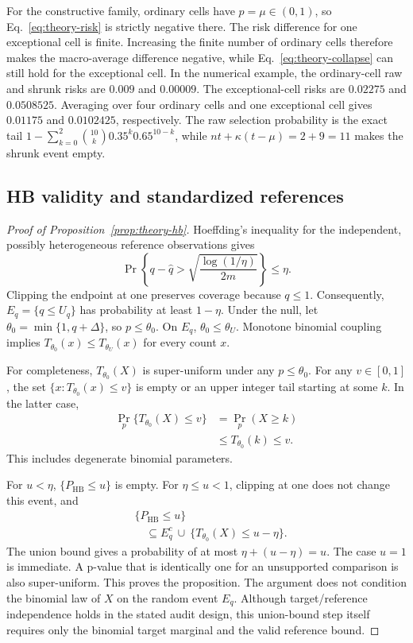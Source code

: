 For the constructive family, ordinary cells have $p=\mu\in(0,1)$, so
Eq.~\eqref{eq:theory-risk} is strictly negative there. The risk difference
for one exceptional cell is finite. Increasing the finite number of
ordinary cells therefore makes the macro-average difference negative,
while Eq.~\eqref{eq:theory-collapse} can still hold for the exceptional
cell. In the numerical example, the ordinary-cell raw and shrunk risks
are $0.009$ and $0.00009$. The exceptional-cell risks are $0.02275$ and
$0.0508525$. Averaging over four ordinary cells and one exceptional cell gives
$0.01175$ and $0.0102425$, respectively. The raw selection probability is
the exact tail
$1-\sum_{k=0}^2 {10\choose k}0.35^k0.65^{10-k}$, while
$nt+\kappa(t-\mu)=2+9=11$ makes the shrunk event empty.

\subsection{HB validity and standardized references}

\begin{proof}[Proof of Proposition~\ref{prop:theory-hb}]
Hoeffding's inequality for the independent, possibly heterogeneous
reference observations gives
\[
 \Pr\left\{q-\widehat q>
       \sqrt{\frac{\log(1/\eta)}{2m}}\right\}\le\eta.
\]
Clipping the endpoint at one preserves coverage because $q\le1$.
Consequently, $E_q=\{q\le U_q\}$ has probability at least $1-\eta$.
Under the null, let $\theta_0=\min\{1,q+\Delta\}$, so
$p\le\theta_0$. On $E_q$, $\theta_0\le\theta_U$. Monotone binomial
coupling implies $T_{\theta_0}(x)\le T_{\theta_U}(x)$ for every count $x$.

For completeness, $T_{\theta_0}(X)$ is super-uniform under any
$p\le\theta_0$. For any $v\in[0,1]$, the set
$\{x:T_{\theta_0}(x)\le v\}$ is empty or an upper integer tail starting at
some $k$. In the latter case,
\[
 \begin{aligned}
 \Pr_p\{T_{\theta_0}(X)\le v\}&=\Pr_p(X\ge k)\\
 &\le T_{\theta_0}(k)\le v.
 \end{aligned}
\]
This includes degenerate binomial parameters.

For $u<\eta$, $\{P_{\mathrm{HB}}\le u\}$ is empty. For
$\eta\le u<1$, clipping at one does not change this event, and
\[
 \begin{aligned}
 &\{P_{\mathrm{HB}}\le u\}\\
 &\quad\subseteq E_q^c\ \cup\
 \{T_{\theta_0}(X)\le u-\eta\}.
 \end{aligned}
\]
The union bound gives a probability of at most $\eta+(u-\eta)=u$.
The case $u=1$ is immediate. A p-value that is identically one for an unsupported
comparison is also super-uniform. This proves the proposition. The
argument does not condition the binomial law of $X$ on the random event
$E_q$. Although target/reference independence holds in the stated audit
design, this union-bound step itself requires only the binomial target
marginal and the valid reference bound.
\end{proof}

